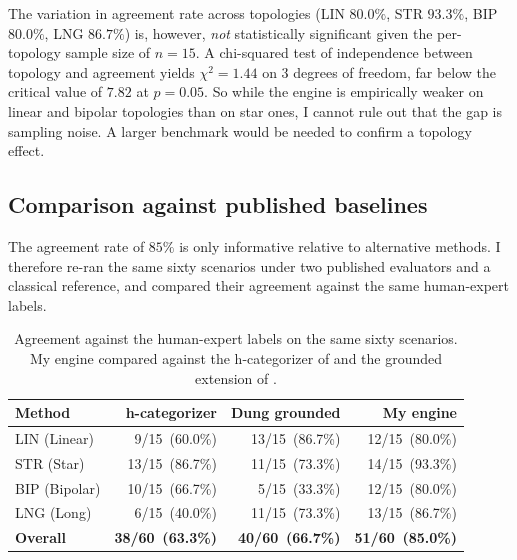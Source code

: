 The variation in agreement rate across topologies (LIN $80.0\%$, STR $93.3\%$, BIP $80.0\%$, LNG $86.7\%$) is, however, \emph{not} statistically significant given the per-topology sample size of $n=15$. A chi-squared test of independence between topology and agreement yields $\chi^{2}=1.44$ on $3$ degrees of freedom, far below the critical value of $7.82$ at $p=0.05$. So while the engine is empirically weaker on linear and bipolar topologies than on star ones, I cannot rule out that the gap is sampling noise. A larger benchmark would be needed to confirm a topology effect.

\subsection{Comparison against published baselines}
\label{sec:eval_baselines}
The agreement rate of $85\%$ is only informative relative to alternative methods. I therefore re-ran the same sixty scenarios under two published evaluators and a classical reference, and compared their agreement against the same human-expert labels.

\begin{table}[h]
\centering
\caption{Agreement against the human-expert labels on the same sixty scenarios. My engine compared against the h-categorizer of \cite{besnard2001logic} and the grounded extension of \cite{dung1995acceptability}.}
\label{tab:baselines}
\begin{tabular}{lrrr}
\toprule
Method & h-categorizer & Dung grounded & My engine \\
\midrule
LIN (Linear)    & \phantom{0}9/15 \,(60.0\%) & 13/15 \,(86.7\%) & 12/15 \,(80.0\%) \\
STR (Star)      & 13/15 \,(86.7\%) & 11/15 \,(73.3\%) & 14/15 \,(93.3\%) \\
BIP (Bipolar)   & 10/15 \,(66.7\%) & \phantom{0}5/15 \,(33.3\%) & 12/15 \,(80.0\%) \\
LNG (Long)      & \phantom{0}6/15 \,(40.0\%) & 11/15 \,(73.3\%) & 13/15 \,(86.7\%) \\
\midrule
\textbf{Overall} & \textbf{38/60 \,(63.3\%)} & \textbf{40/60 \,(66.7\%)} & \textbf{51/60 \,(85.0\%)} \\
\bottomrule
\end{tabular}
\end{table}

